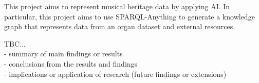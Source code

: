 This project aims to represent musical heritage data by applying AI. In particular, this project aims to use SPARQL-Anything to generate a knowledge graph that represents data from an organ dataset and external resources. 

TBC...
\\- summary of main findings or results
\\- conclusions from the results and findings
\\- implications or application of research (future findings or extensions)